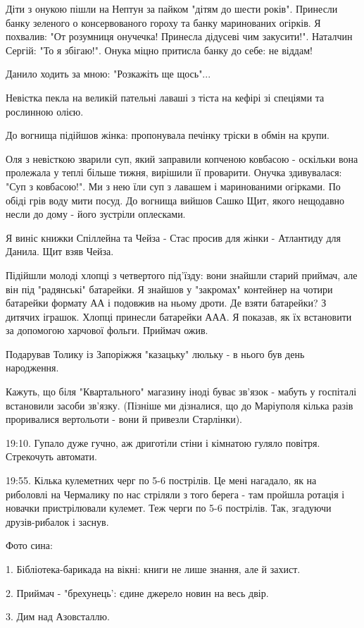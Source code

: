 Діти з онукою пішли на Нептун за пайком "дітям до шести років". Принесли банку
зеленого о консервованого гороху та банку маринованих огірків. Я похвалив: "От
розумниця онучечка! Принесла дідусеві чим закусити!". Наталчин Сергій: "То я
збігаю!". Онука міцно притисла банку до себе: не віддам!

Данило ходить за мною: "Розкажіть ще щось"...

Невістка пекла на великій пательні лаваші з тіста на кефірі зі спеціями та
рослинною олією.

До вогнища підійшов жінка: пропонувала печінку тріски в обмін на крупи.

Оля з невісткою зварили суп, який заправили копченою ковбасою - оскільки вона
пролежала у теплі більше тижня, вирішили її проварити. Онучка здивувалася: "Суп
з ковбасою!". Ми з нею їли суп з лавашем і маринованими огірками. По обіді грів
воду мити посуд. До вогнища вийшов Сашко Щит, якого нещодавно несли до дому -
його зустріли оплесками.

Я виніс книжки Спіллейна та Чейза - Стас просив для жінки - Атлантиду для
Данила. Щит взяв Чейза.

Підійшли молоді хлопці з четвертого під'їзду: вони знайшли старий приймач, але
він під "радянські" батарейки. Я знайшов у "закромах"  контейнер на чотири
батарейки формату АА і подовжив на ньому дроти. Де взяти батарейки? З дитячих
іграшок. Хлопці принесли батарейки  ААА. Я показав, як їх встановити за
допомогою харчової фольги. Приймач ожив.

Подарував Толику із Запоріжжя "казацьку" люльку - в нього був день народження.

Кажуть, що біля "Квартального" магазину іноді буває зв'язок - мабуть у
госпіталі встановили засоби зв'язку. (Пізніше ми дізналися, що до Маріуполя
кілька разів проривалися вертольоти - вони й привезли Старлінки).

19:10. Гупало дуже гучно, аж дриготіли стіни і кімнатою гуляло повітря.
Стрекочуть автомати.

19:55. Кілька кулеметних черг по 5-6 пострілів. Це мені нагадало, як на
риболовлі на Чермалику по нас стріляли з того берега - там пройшла ротація і
новачки  пристрілювали кулемет. Теж черги по 5-6 пострілів. Так, згадуючи
друзів-рибалок і заснув. 

Фото сина:

1. Бібліотека-барикада на вікні: книги не лише знання, але й захист.

2. Приймач - "брехунець': єдине джерело новин на весь двір.

3. Дим над Азовсталлю.

